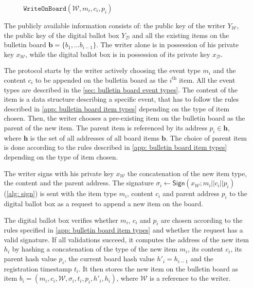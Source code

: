 \begin{figure}[ht]
    \renewcommand\figurename{Protocol}
    \caption{$\mathtt{WriteOnBoard}(\mathcal{W}, m_i, c_i, p_i)$}
    \label{pro: write on board}
\end{figure}

The publicly available information consists of: the public key of the writer $Y_\mathcal{W}$, the public key of the digital ballot box $Y_\mathcal{D}$ and all the existing items on the bulletin board $\boldsymbol{b} = \{b_1, ... b_{i-1}\}$. The writer alone is in possession of his private key $x_\mathcal{W}$, while the digital ballot box is in possession of its private key $x_\mathcal{D}$.

The protocol starts by the writer actively choosing the event type $m_i$ and the content $c_i$ to be appended on the bulletin board as the $i^\mathrm{th}$ item. All the event types are described in the \cref{sec: bulletin board event types}. The content of the item is a data structure describing a specific event, that has to follow the rules described in \cref{app: bulletin board item types} depending on the type of item chosen. Then, the writer chooses a pre-existing item on the bulletin board as the parent of the new item. The parent item is referenced by its address $p_i \in \boldsymbol{h}$, where $\boldsymbol{h}$ is the set of all addresses of all board items $\boldsymbol{b}$. The choice of parent item is done according to the rules described in \cref{app: bulletin board item types} depending on the type of item chosen.

The writer signs with his private key $x_\mathcal{W}$ the concatenation of the new item type, the content and the parent address. The signature $\sigma_i \gets \mathsf{Sign}(x_\mathcal{W}; m_i || c_i || p_i)$ (\cref{alg: sign}) is sent with the item type $m_i$, content $c_i$ and parent address $p_i$ to the digital ballot box as a request to append a new item on the board.

The digital ballot box verifies whether $m_i$, $c_i$ and $p_i$ are chosen according to the rules specified in \cref{app: bulletin board item types} and whether the request has a valid signature. If all validations succeed, it computes the address of the new item $h_i$ by hashing a concatenation of the type of the new item $m_i$, its content $c_i$, its parent hash value $p_i$, the current board hash value $h'_i = h_{i-1}$ and the registration timestamp $t_i$. It then stores the new item on the bulletin board as item $b_i = (m_i, c_i, \mathcal{W}, \sigma_i, t_i, p_i, h'_i, h_i)$, where $\mathcal{W}$ is a reference to the writer.

